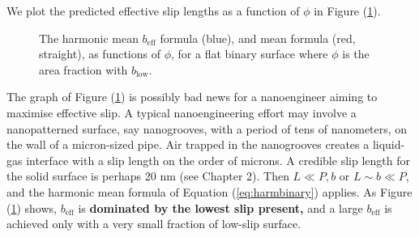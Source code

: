 \documentclass[12pt, a4paper, twoside, openright]{book}
\newcommand{\beff}{\ensuremath{b_{\mathrm{eff}}}}
\newcommand{\bmin}{\ensuremath{b_{\mathrm{min}}}}
\newcommand{\blow}{\ensuremath{b_{\mathrm{low}}}}
\newcommand{\bhigh}{\ensuremath{b_{\mathrm{high}}}}
\begin{document}
We plot the predicted effective slip lengths as a function of $\phi$ in Figure (\ref{formulaeplot}).

\begin{figure}[ht]
\centering
{}
\caption{The harmonic mean $\beff$ formula (blue), and mean formula (red, straight), as functions of  $\phi$, for a flat binary surface where $\phi$ is the area fraction with $\blow$.}\label{formulaeplot}
\end{figure}

\clearpage
The graph of Figure (\ref{formulaeplot}) is possibly bad news for a nanoengineer aiming to maximise effective slip.  A typical nanoengineering effort may involve a nanopatterned surface, say nanogrooves, with a period of tens of nanometers, on the wall of a micron-sized pipe.  Air trapped in the nanogrooves creates a liquid-gas interface with a slip length on the order of microns.  A credible slip length for the solid surface is perhaps 20 nm (see Chapter 2). Then $L \ll P, b$ or $L \sim b \ll P$, and the harmonic mean formula of Equation (\ref{eq:harmbinary}) applies.  As Figure (\ref{formulaeplot}) shows, $\beff$ is \textbf{dominated by the lowest slip present,} and a large $\beff$ is achieved only with a very small fraction of low-slip surface.

\end{document}
